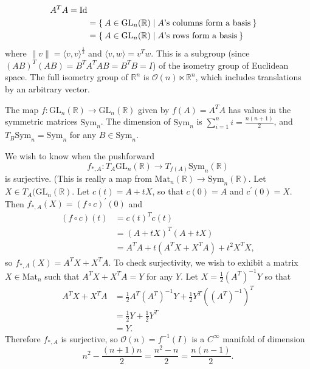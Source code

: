 \begin{xmpl}
\begin{enumerate}
{\begin{align*}
{            A^T A = \mathrm{Id}
         } \\
      &= \Set{ A \in \mathrm{GL}_n(\mathbb{R}) |
            \text{$A$'s columns form a basis}
         } \\
      &= \Set{ A \in \mathrm{GL}_n(\mathbb{R}) |
            \text{$A$'s rows form a basis}
         } \\
      \end{align*}
      where $\|v\| = \langle v, v \rangle^{\frac{1}{2}}$ and
      $\langle v, w \rangle = v^T w$. This is a subgroup (since
      $(AB)^T(AB) = B^T A^T A B = B^T B = I$) of the
      isometry group of Euclidean space.
      The full isometry group of $\mathbb{R}^n$ is
      $\mathcal{O}(n) \ltimes \mathbb{R}^n$, which includes
      translations by an arbitrary vector.

      The map $f: \mathrm{GL}_n(\mathbb{R}) \to
      \mathrm{GL}_n(\mathbb{R})$ given by $f(A) = A^T A$ has values in
      the symmetric matrices $\mathrm{Sym}_n$. The dimension of
      $\mathrm{Sym}_n$ is $\sum_{i=1}^n i = \frac{n(n+1)}{2}$, and
      $T_B \mathrm{Sym}_n = \mathrm{Sym}_n$ for any $B \in
      \mathrm{Sym}_n$.

      We wish to know when the pushforward
      $$
        f_{\ast, A} :
            T_A \mathrm{GL}_n(\mathbb{R})
        \to T_{f(A)} \mathrm{Sym}_n(\mathbb{R})
      $$
      is surjective. (This is really a map from
      $\mathrm{Mat}_n(\mathbb{R}) \to \mathrm{Sym}_n(\mathbb{R})$.
      Let $X \in T_A(\mathrm{GL}_n(\mathbb{R})$. Let
      $c(t) = A + tX$, so that $c(0) = A$ and $c^\prime(0) = X$. Then
      $f_{\ast, A}(X) = (f \circ c)^\prime(0)$ and
      \begin{align*}
         (f \circ c)(t)
      &= c(t)^T c(t) \\
      &= (A + tX)^T(A + tX) \\
      &= A^TA + t(A^T X + X^T A) + t^2 X^T X,
      \end{align*}
      so $f_{\ast, A}(X) = A^T X + X^T A$. To check surjectivity, we
      wish to exhibit a matrix $X \in \mathrm{Mat}_n$ such that
      $A^T X + X^T A = Y$ for any $Y$. Let
      $X = \frac{1}{2} (A^T)^{-1} Y$ so that
      \begin{align*}
         A^T X + X^T A
      &= \frac{1}{2}
           A^T (A^T)^{-1} Y
       + \frac{1}{2}
           Y^T((A^T)^{-1})^T \\
      &= \frac{1}{2} Y + \frac{1}{2} Y^T \\
      &= Y.
      \end{align*}
      Therefore $f_{\ast, A}$ is surjective, so
      $\mathcal{O}(n) = f^{-1}(I)$ is a $C^\infty$ manifold of
      dimension
      $$
        n^2 - \frac{(n+1)n}{2}
      = \frac{n^2 - n}{2}
      = \frac{n(n-1)}{2}.
      $$

}
\end{enumerate}
\end{xmpl}
